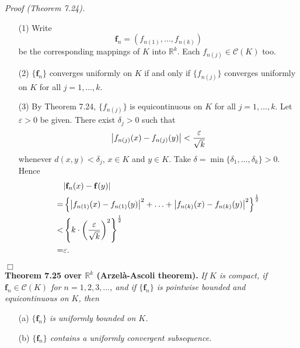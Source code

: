 \documentclass{article}
\begin{document}
\emph{Proof (Theorem 7.24).}
\begin{enumerate}
\item[(1)]
  Write
  \[
    \mathbf{f}_n = \left(f_{n(1)}, \ldots, f_{n(k)}\right)
  \]
  be the corresponding mappings of $K$ into $\mathbb{R}^k$.
  Each $f_{n(j)} \in \mathscr{C}(K)$ too.

\item[(2)]
  $\{\mathbf{f}_n\}$ converges uniformly on $K$
  if and only if
  $\{ f_{n(j)} \}$ converges uniformly on $K$ for all $j=1,\ldots,k$.

\item[(3)]
  By Theorem 7.24,
  $\{ f_{n(j)} \}$ is equicontinuous on $K$ for all $j=1,\ldots,k$.
  Let $\varepsilon > 0$ be given.
  There exist $\delta_j > 0$ such that
  \[
    \abs{f_{n(j)}(x) - f_{n(j)}(y)} < \frac{\varepsilon}{\sqrt{k}}
  \]
  whenever $d(x,y) < \delta_j$, $x \in K$ and $y \in K$.
  Take $\delta = \min\{\delta_1, \ldots, \delta_k\} > 0$.
  Hence
  \begin{align*}
    &\abs{\mathbf{f}_n(x) - \mathbf{f}(y)} \\
    =& \left\{ \abs{f_{n(1)}(x) - f_{n(1)}(y)}^2
      + \ldots
      + \abs{f_{n(k)}(x) - f_{n(k)}(y)}^2 \right\}^{\frac{1}{2}} \\
    <& \left\{ k \cdot \left(\frac{\varepsilon}{\sqrt{k}}\right)^2 \right\}^{\frac{1}{2}} \\
    =& \varepsilon.
  \end{align*}
\end{enumerate}
$\Box$ \\



\textbf{Theorem 7.25 over $\mathbb{R}^k$ (Arzel\`{a}-Ascoli theorem).}
\emph{If $K$ is compact, if $\mathbf{f}_n \in \mathscr{C}(K)$ for $n = 1,2,3,\ldots$,
and if $\{\mathbf{f}_n\}$ is pointwise bounded and equicontinuous on $K$, then}
\begin{enumerate}
\item[(a)]
  \emph{$\{\mathbf{f}_n\}$ is uniformly bounded on $K$.}

\item[(b)]
  \emph{$\{\mathbf{f}_n\}$ contains a uniformly convergent subsequence.} \\
\end{enumerate}
\end{document}
